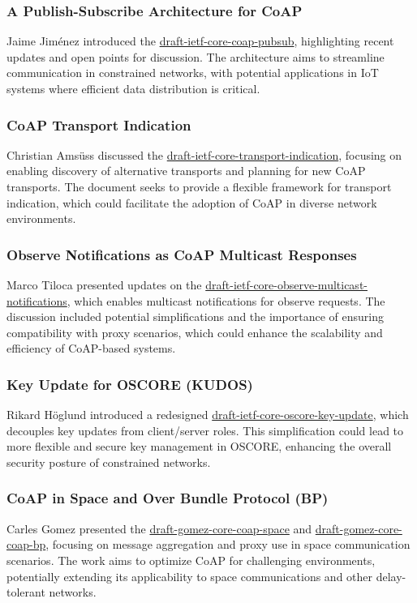 \documentclass{article}
\begin{document}
\subsubsection{A Publish-Subscribe Architecture for CoAP}
Jaime Jiménez introduced the \href{https://datatracker.ietf.org/doc/draft-ietf-core-coap-pubsub/}{draft-ietf-core-coap-pubsub}, highlighting recent updates and open points for discussion. The architecture aims to streamline communication in constrained networks, with potential applications in IoT systems where efficient data distribution is critical.

\subsubsection{CoAP Transport Indication}
Christian Amsüss discussed the \href{https://datatracker.ietf.org/doc/draft-ietf-core-transport-indication/}{draft-ietf-core-transport-indication}, focusing on enabling discovery of alternative transports and planning for new CoAP transports. The document seeks to provide a flexible framework for transport indication, which could facilitate the adoption of CoAP in diverse network environments.

\subsubsection{Observe Notifications as CoAP Multicast Responses}
Marco Tiloca presented updates on the \href{https://datatracker.ietf.org/doc/draft-ietf-core-observe-multicast-notifications/}{draft-ietf-core-observe-multicast-notifications}, which enables multicast notifications for observe requests. The discussion included potential simplifications and the importance of ensuring compatibility with proxy scenarios, which could enhance the scalability and efficiency of CoAP-based systems.

\subsubsection{Key Update for OSCORE (KUDOS)}
Rikard Höglund introduced a redesigned \href{https://datatracker.ietf.org/doc/draft-ietf-core-oscore-key-update/}{draft-ietf-core-oscore-key-update}, which decouples key updates from client/server roles. This simplification could lead to more flexible and secure key management in OSCORE, enhancing the overall security posture of constrained networks.

\subsubsection{CoAP in Space and Over Bundle Protocol (BP)}
Carles Gomez presented the \href{https://datatracker.ietf.org/doc/draft-gomez-core-coap-space/}{draft-gomez-core-coap-space} and \href{https://datatracker.ietf.org/doc/draft-gomez-core-coap-bp/}{draft-gomez-core-coap-bp}, focusing on message aggregation and proxy use in space communication scenarios. The work aims to optimize CoAP for challenging environments, potentially extending its applicability to space communications and other delay-tolerant networks.
\end{document}
